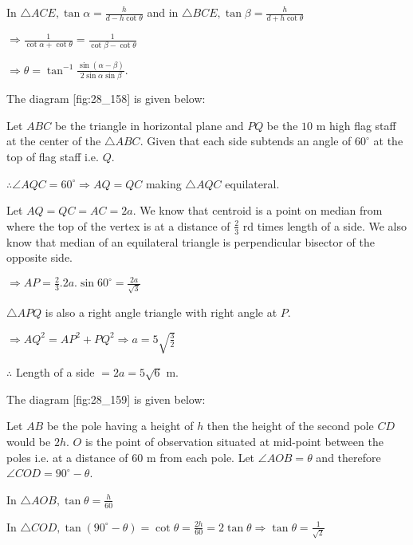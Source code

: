   In $\triangle ACE, \tan\alpha = \frac{h}{d - h\cot\theta}$ and in $\triangle BCE, \tan\beta
  = \frac{h}{d + h\cot\theta}$

  $\Rightarrow \frac{1}{\cot\alpha + \cot\theta} = \frac{1}{\cot\beta - \cot\theta}$

  $\Rightarrow \theta = \tan^{-1}\frac{\sin(\alpha - \beta)}{2\sin\alpha\sin\beta}$.

\item The diagram [fig:28_158] is given below:

  \startplacefigure[reference=fig:28_158]
    \externalfigure[28_158.pdf]
  \stopplacefigure

  Let $ABC$ be the triangle in horizontal plane and $PQ$ be the $10$ m high flag staff
  at the center of the $\triangle ABC$. Given that each side subtends an angle of $60^\circ$
  at the top of flag staff i.e. $Q$.

  $\therefore  \angle AQC = 60^\circ \Rightarrow AQ = QC$ making $\triangle AQC$ equilateral.

  Let $AQ = QC = AC = 2a$. We know that centroid is a point on median from where the top of the
  vertex is at a distance of $\frac{2}{3}$ rd times length of a side. We also know that median of
  an equilateral triangle is perpendicular bisector of the opposite side.

  $\Rightarrow AP = \frac{2}{3}.2a.\sin60^\circ = \frac{2a}{\sqrt{3}}$

  $\triangle APQ$ is also a right angle triangle with right angle at $P$.

  $\Rightarrow AQ^2 = AP^2 + PQ^2 \Rightarrow a = 5\sqrt{\frac{3}{2}}$

  $\therefore$ Length of a side $= 2a = 5\sqrt{6}$ m.

\item The diagram [fig:28_159] is given below:

  \startplacefigure[reference=fig:28_159]
    \externalfigure[28_159.pdf]
  \stopplacefigure

  Let $AB$ be the pole having a height of $h$ then the height of the second pole $CD$
  would be $2h$. $O$ is the point of observation situated at mid-point between the poles
  i.e. at a distance of $60$ m from each pole. Let $\angle AOB = \theta$ and therefore
  $\angle COD = 90^\circ - \theta$.

  In $\triangle AOB, \tan\theta = \frac{h}{60}$

  In $\triangle COD, \tan(90^\circ - \theta) = \cot\theta = \frac{2h}{60} = 2\tan\theta \Rightarrow
  \tan\theta = \frac{1}{\sqrt{2}}$

